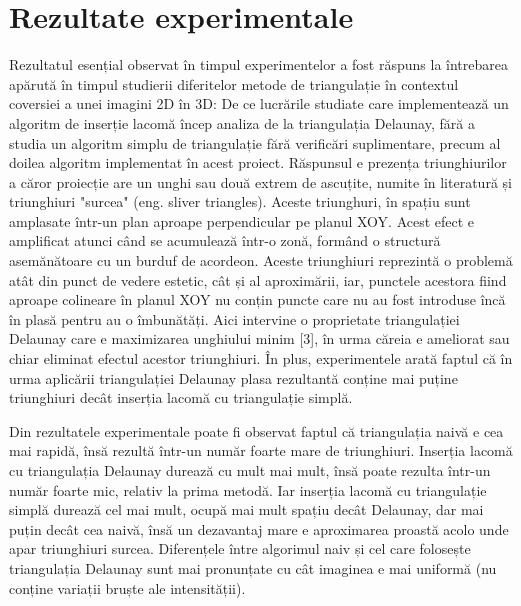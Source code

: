 \documentclass[12pt]{article}
\begin{document}
\section{Rezultate experimentale}

Rezultatul esențial observat în timpul experimentelor a fost răspuns la întrebarea apărută în timpul studierii diferitelor metode de triangulație în contextul coversiei a unei imagini 2D în 3D: De ce lucrările studiate care implementează un algoritm de inserție lacomă încep analiza de la triangulația Delaunay, fără a studia un algoritm simplu de triangulație fără verificări suplimentare, precum al doilea algoritm implementat în acest proiect. Răspunsul e prezența triunghiurilor a căror proiecție are un unghi sau două extrem de ascuțite, numite în literatură și triunghiuri "surcea" (eng. sliver triangles). Aceste triunghuri, în spațiu sunt amplasate într-un plan aproape perpendicular pe planul XOY. Acest efect e amplificat atunci când se acumulează într-o zonă, formând o structură asemănătoare cu un burduf de acordeon. Aceste triunghiuri reprezintă o problemă atât din punct de vedere estetic, cât și al aproximării, iar, punctele acestora fiind aproape colineare în planul XOY nu conțin puncte care nu au fost introduse încă în plasă pentru au o îmbunătăți. Aici intervine o proprietate triangulației Delaunay care e maximizarea unghiului minim [3], în urma căreia e ameliorat sau chiar eliminat efectul acestor triunghiuri. În plus, experimentele arată faptul că în urma aplicării triangulației Delaunay plasa rezultantă conține mai puține triunghiuri decât inserția lacomă cu triangulație simplă.

Din rezultatele experimentale poate fi observat faptul că triangulația naivă e cea mai rapidă, însă rezultă într-un număr foarte mare de triunghiuri. Inserția lacomă cu triangulația Delaunay durează cu mult mai mult, însă poate rezulta într-un număr foarte mic, relativ la prima metodă. Iar inserția lacomă cu triangulație simplă durează cel mai mult, ocupă mai mult spațiu decât Delaunay, dar mai puțin decât cea naivă, însă un dezavantaj mare e aproximarea proastă acolo unde apar triunghiuri surcea. Diferențele între algorimul naiv și cel care folosește triangulația Delaunay sunt mai pronunțate cu cât imaginea e mai uniformă (nu conține variații bruște ale intensității).
\end{document}

